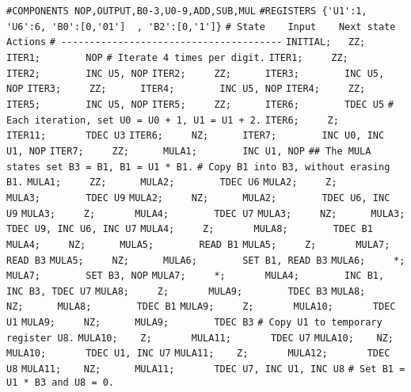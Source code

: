 \begin{apgsembly}
	\centering
	\begin{minipage}[t]{.49\textwidth}
		\begin{algorithmic}\tiny
			\State \verb|#COMPONENTS NOP,OUTPUT,B0-3,U0-9,ADD,SUB,MUL|
			\State \verb|#REGISTERS {'U1':1, 'U6':6, 'B0':[0,'01']	, 'B2':[0,'1']}|
			\State \verb|# State    Input    Next state    Actions|
			\State \verb|# ---------------------------------------|
			\State \verb|INITIAL;   ZZ;      ITER1;        NOP|
			\State \verb||
			\State \verb|# Iterate 4 times per digit.|
			\State \verb|ITER1;     ZZ;      ITER2;        INC U5, NOP|
			\State \verb|ITER2;     ZZ;      ITER3;        INC U5, NOP|
			\State \verb|ITER3;     ZZ;      ITER4;        INC U5, NOP|
			\State \verb|ITER4;     ZZ;      ITER5;        INC U5, NOP|
			\State \verb|ITER5;     ZZ;      ITER6;        TDEC U5|
			\State \verb||
			\State \verb|# Each iteration, set U0 = U0 + 1, U1 = U1 + 2.|
			\State \verb|ITER6;     Z;       ITER11;       TDEC U3|
			\State \verb|ITER6;     NZ;      ITER7;        INC U0, INC U1, NOP|
			\State \verb|ITER7;     ZZ;      MULA1;        INC U1, NOP|
			\State \verb||
			\State \verb|## The MULA states set B3 = B1, B1 = U1 * B1.|
			\State \verb|# Copy B1 into B3, without erasing B1.|
			\State \verb|MULA1;     ZZ;      MULA2;        TDEC U6|
			\State \verb|MULA2;     Z;       MULA3;        TDEC U9|
			\State \verb|MULA2;     NZ;      MULA2;        TDEC U6, INC U9|
			\State \verb|MULA3;     Z;       MULA4;        TDEC U7|
			\State \verb|MULA3;     NZ;      MULA3;        TDEC U9, INC U6, INC U7|
			\State \verb|MULA4;     Z;       MULA8;        TDEC B1|
			\State \verb|MULA4;     NZ;      MULA5;        READ B1|
			\State \verb|MULA5;     Z;       MULA7;        READ B3|
			\State \verb|MULA5;     NZ;      MULA6;        SET B1, READ B3|
			\State \verb|MULA6;     *;       MULA7;        SET B3, NOP|
			\State \verb|MULA7;     *;       MULA4;        INC B1, INC B3, TDEC U7|
			\State \verb|MULA8;     Z;       MULA9;        TDEC B3|
			\State \verb|MULA8;     NZ;      MULA8;        TDEC B1|
			\State \verb|MULA9;     Z;       MULA10;       TDEC U1|
			\State \verb|MULA9;     NZ;      MULA9;        TDEC B3|
			\State \verb||
			\State \verb|# Copy U1 to temporary register U8.|
			\State \verb|MULA10;    Z;       MULA11;       TDEC U7|
			\State \verb|MULA10;    NZ;      MULA10;       TDEC U1, INC U7|
			\State \verb|MULA11;    Z;       MULA12;       TDEC U8|
			\State \verb|MULA11;    NZ;      MULA11;       TDEC U7, INC U1, INC U8|
			\State \verb||
			\State \verb|# Set B1 = U1 * B3 and U8 = 0.|

\end{algorithmic}
\end{minipage}
\end{apgsembly}

